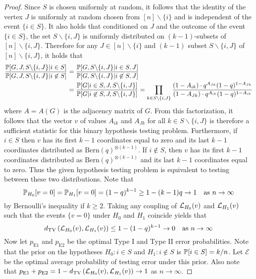 \begin{proof}
Since $S$ is chosen uniformly at random, it follows that the identity of the vertex $J$ is uniformly at random chosen from $[n] \backslash \{ i\}$ and is independent of the event $\{ i \in S\}$. It also holds that conditioned on $J$ and the outcome of the event $\{ i \in S\}$, the set $S \backslash \{i, J\}$ is uniformly distributed on $(k-1)$-subsets of $[n] \backslash \{i, J\}$. Therefore for any $J \in [n] \backslash \{i\}$ and $(k-1)$ subset $S\backslash \{i, J\}$ of $[n]\backslash \{i, J\}$, it holds that
\begin{align*}
\frac{\mathbb{P}[G, J, S \backslash \{i, J\} | i \in S]}{\mathbb{P}[G, J, S \backslash \{i, J\} | i \not\in S]} &= \frac{\mathbb{P}[G, S \backslash \{i, J\} | i \in S, J]}{\mathbb{P}[G, S \backslash \{i, J\} | i \not\in S, J]} \\
&= \frac{\mathbb{P}[G | i \in S, J, S \backslash \{i, J\}]}{\mathbb{P}[G | i \not\in S, J, S \backslash \{i, J\}]} = \prod_{k \in S \backslash \{i, J\}} \frac{(1 - A_{ik}) \cdot q^{A_{Jk}}(1 - q)^{1 - A_{Jk}}}{(1 - A_{Jk}) \cdot q^{A_{ik}}(1 - q)^{1 - A_{ik}}}
\end{align*}
where $A = A(G)$ is the adjacency matrix of $G$. From this factorization, it follows that the vector $v$ of values $A_{ik}$ and $A_{Jk}$ for all $k \in S\backslash \{i, J\}$ is therefore a sufficient statistic for this binary hypothesis testing problem. Furthermore, if $i \in S$ then $v$ has its first $k - 1$ coordinates equal to zero and its last $k - 1$ coordinates distributed as $\text{Bern}(q)^{\otimes (k - 1)}$. If $i \not \in S$, then $v$ has its first $k - 1$ coordinates distributed as $\text{Bern}(q)^{\otimes (k - 1)}$ and its last $k - 1$ coordinates equal to zero.  Thus the given hypothesis testing problem is equivalent to testing between these two distributions. Note that
$$\mathbb{P}_{H_0}[v = 0] = \mathbb{P}_{H_1}[v = 0] = (1 - q)^{k - 1} \ge 1 - (k - 1)q \to 1 \quad \text{as } n \to \infty$$
by Bernoulli's inequality if $k \ge 2$. Taking any coupling of $\mathcal{L}_{H_0}(v)$ and $\mathcal{L}_{H_1}(v)$ such that the events $\{ v = 0 \}$ under $H_0$ and $H_1$ coincide yields that
$$d_{\text{TV}}\left( \mathcal{L}_{H_0}(v), \mathcal{L}_{H_1}(v) \right) \le 1 - (1 - q)^{k-1} \to 0 \quad \text{as } n \to \infty$$
Now let $p_{\text{E1}}$ and $p_{\text{E2}}$ be the optimal Type I and Type II error probabilities. Note that the prior on the hypotheses $H_0 : i \in S$ and $H_1 : i \not \in S$ is $\mathbb{P}[i \in S] = k/n$. Let $\mathcal{E}$ be the optimal average probability of testing error under this prior. Also note that $p_{\text{E1}} + p_{\text{E2}} = 1 - d_{\text{TV}}\left( \mathcal{L}_{H_0}(v), \mathcal{L}_{H_1}(v) \right) \to 1$ as $n \to \infty$.


\end{proof}

